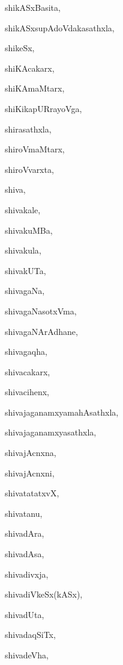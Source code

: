 \begin{multicols}{2}
{shikASxBasita}, \pageref{shikASxBasita}

{shikASxsupAdoVdakasathxla}, \pageref{shikASxsupAdoVdakasathxla}

{shikeSx}, \pageref{shikeSx}

{shiKAcakarx}, \pageref{shiKAcakarx}

{shiKAmaMtarx}, \pageref{shiKAmaMtarx}

{shiKikapURrayoVga}, \pageref{shiKikapURrayoVga}

{shirasathxla}, \pageref{shirasathxla}

{shiroVmaMtarx}, \pageref{shiroVmaMtarx}

{shiroVvarxta}, \pageref{shiroVvarxta}

{shiva}, \pageref{shiva}

{shivakale}, \pageref{shivakale}

{shivakuMBa}, \pageref{shivakuMBa}

{shivakula}, \pageref{shivakula}

{shivakUTa}, \pageref{shivakUTa}

{shivagaNa}, \pageref{shivagaNa}

{shivagaNasotxVma}, \pageref{shivagaNasotxVma}

{shivagaNArAdhane}, \pageref{shivagaNArAdhane}

{shivagaqha}, \pageref{shivagaqha}

{shivacakarx}, \pageref{shivacakarx}

{shivacihenx}, \pageref{shivacihenx}

{shivajaganamxyamahAsathxla}, \pageref{shivajaganamxyamahAsathxla}

{shivajaganamxyasathxla}, \pageref{shivajaganamxyasathxla}

{shivajAcnxna}, \pageref{shivajAcnxna}

{shivajAcnxni}, \pageref{shivajAcnxni}

{shivatatatxvX}, \pageref{shivatatatxvX}

{shivatanu}, \pageref{shivatanu}

{shivadAra}, \pageref{shivadAra}

{shivadAsa}, \pageref{shivadAsa}

{shivadivxja}, \pageref{shivadivxja}

{shivadiVkeSx(kASx)}, \pageref{shivadiVkeSxkASx}

{shivadUta}, \pageref{shivadUta}

{shivadaqSiTx}, \pageref{shivadaqSiTx}

{shivadeVha}, \pageref{shivadeVha}


\end{multicols}
